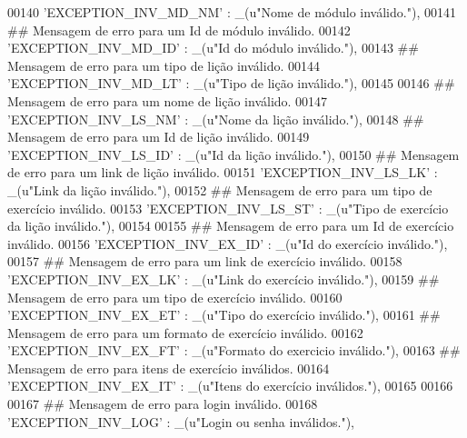 \begin{DoxyCode}
00140     \textcolor{stringliteral}{'EXCEPTION\_INV\_MD\_NM'} : \_(\textcolor{stringliteral}{u"Nome de módulo inválido."}),
00141     \textcolor{comment}{## Mensagem de erro para um Id de módulo inválido.}
00142     \textcolor{stringliteral}{'EXCEPTION\_INV\_MD\_ID'} : \_(\textcolor{stringliteral}{u"Id do módulo inválido."}),
00143     \textcolor{comment}{## Mensagem de erro para um tipo de lição inválido.}
00144     \textcolor{stringliteral}{'EXCEPTION\_INV\_MD\_LT'} : \_(\textcolor{stringliteral}{u"Tipo de lição inválido."}),
00145 
00146     \textcolor{comment}{## Mensagem de erro para um nome de lição inválido.}
00147     \textcolor{stringliteral}{'EXCEPTION\_INV\_LS\_NM'} : \_(\textcolor{stringliteral}{u"Nome da lição inválido."}),
00148     \textcolor{comment}{## Mensagem de erro para um Id de lição inválido.}
00149     \textcolor{stringliteral}{'EXCEPTION\_INV\_LS\_ID'} : \_(\textcolor{stringliteral}{u"Id da lição inválido."}),
00150     \textcolor{comment}{## Mensagem de erro para um link de lição inválido.}
00151     \textcolor{stringliteral}{'EXCEPTION\_INV\_LS\_LK'} : \_(\textcolor{stringliteral}{u"Link da lição inválido."}),
00152     \textcolor{comment}{## Mensagem de erro para um tipo de exercício inválido.}
00153     \textcolor{stringliteral}{'EXCEPTION\_INV\_LS\_ST'} : \_(\textcolor{stringliteral}{u"Tipo de exercício da lição inválido."}),
00154 
00155     \textcolor{comment}{## Mensagem de erro para um Id de exercício inválido.}
00156     \textcolor{stringliteral}{'EXCEPTION\_INV\_EX\_ID'} : \_(\textcolor{stringliteral}{u"Id do exercício inválido."}),
00157     \textcolor{comment}{## Mensagem de erro para um link de exercício inválido.}
00158     \textcolor{stringliteral}{'EXCEPTION\_INV\_EX\_LK'} : \_(\textcolor{stringliteral}{u"Link do exercício inválido."}),
00159     \textcolor{comment}{## Mensagem de erro para um tipo de exercício inválido.}
00160     \textcolor{stringliteral}{'EXCEPTION\_INV\_EX\_ET'} : \_(\textcolor{stringliteral}{u"Tipo do exercício inválido."}),
00161     \textcolor{comment}{## Mensagem de erro para um formato de exercício inválido.}
00162     \textcolor{stringliteral}{'EXCEPTION\_INV\_EX\_FT'} : \_(\textcolor{stringliteral}{u"Formato do exercicio inválido."}),
00163     \textcolor{comment}{## Mensagem de erro para itens de exercício inválidos.}
00164     \textcolor{stringliteral}{'EXCEPTION\_INV\_EX\_IT'} : \_(\textcolor{stringliteral}{u"Itens do exercício inválidos."}),
00165 
00166 
00167     \textcolor{comment}{## Mensagem de erro para login inválido.}
00168     \textcolor{stringliteral}{'EXCEPTION\_INV\_LOG'} : \_(\textcolor{stringliteral}{u"Login ou senha inválidos."}),

\end{DoxyCode}
